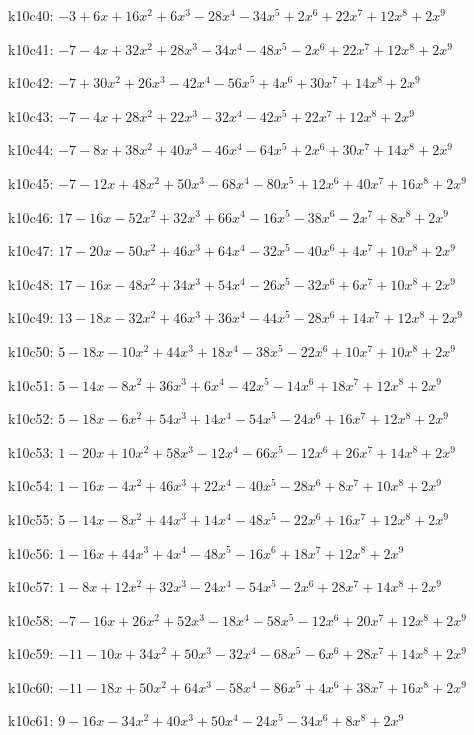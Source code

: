 k10c40: $ -3+6x+16x^{2}+6x^{3}-28x^{4}-34x^{5}+2x^{6}+22x^{7}+12x^{8}+2x^{9} $ 

k10c41: $ -7-4x+32x^{2}+28x^{3}-34x^{4}-48x^{5}-2x^{6}+22x^{7}+12x^{8}+2x^{9} $ 

k10c42: $ -7+30x^{2}+26x^{3}-42x^{4}-56x^{5}+4x^{6}+30x^{7}+14x^{8}+2x^{9} $ 

k10c43: $ -7-4x+28x^{2}+22x^{3}-32x^{4}-42x^{5}+22x^{7}+12x^{8}+2x^{9} $ 

k10c44: $ -7-8x+38x^{2}+40x^{3}-46x^{4}-64x^{5}+2x^{6}+30x^{7}+14x^{8}+2x^{9} $ 

k10c45: $ -7-12x+48x^{2}+50x^{3}-68x^{4}-80x^{5}+12x^{6}+40x^{7}+16x^{8}+2x^{9} $ 

k10c46: $ 17-16x-52x^{2}+32x^{3}+66x^{4}-16x^{5}-38x^{6}-2x^{7}+8x^{8}+2x^{9} $ 

k10c47: $ 17-20x-50x^{2}+46x^{3}+64x^{4}-32x^{5}-40x^{6}+4x^{7}+10x^{8}+2x^{9} $ 

k10c48: $ 17-16x-48x^{2}+34x^{3}+54x^{4}-26x^{5}-32x^{6}+6x^{7}+10x^{8}+2x^{9} $ 

k10c49: $ 13-18x-32x^{2}+46x^{3}+36x^{4}-44x^{5}-28x^{6}+14x^{7}+12x^{8}+2x^{9} $ 

k10c50: $ 5-18x-10x^{2}+44x^{3}+18x^{4}-38x^{5}-22x^{6}+10x^{7}+10x^{8}+2x^{9} $ 

k10c51: $ 5-14x-8x^{2}+36x^{3}+6x^{4}-42x^{5}-14x^{6}+18x^{7}+12x^{8}+2x^{9} $ 

k10c52: $ 5-18x-6x^{2}+54x^{3}+14x^{4}-54x^{5}-24x^{6}+16x^{7}+12x^{8}+2x^{9} $ 

k10c53: $ 1-20x+10x^{2}+58x^{3}-12x^{4}-66x^{5}-12x^{6}+26x^{7}+14x^{8}+2x^{9} $ 

k10c54: $ 1-16x-4x^{2}+46x^{3}+22x^{4}-40x^{5}-28x^{6}+8x^{7}+10x^{8}+2x^{9} $ 

k10c55: $ 5-14x-8x^{2}+44x^{3}+14x^{4}-48x^{5}-22x^{6}+16x^{7}+12x^{8}+2x^{9} $ 

k10c56: $ 1-16x+44x^{3}+4x^{4}-48x^{5}-16x^{6}+18x^{7}+12x^{8}+2x^{9} $ 

k10c57: $ 1-8x+12x^{2}+32x^{3}-24x^{4}-54x^{5}-2x^{6}+28x^{7}+14x^{8}+2x^{9} $ 

k10c58: $ -7-16x+26x^{2}+52x^{3}-18x^{4}-58x^{5}-12x^{6}+20x^{7}+12x^{8}+2x^{9} $ 

k10c59: $ -11-10x+34x^{2}+50x^{3}-32x^{4}-68x^{5}-6x^{6}+28x^{7}+14x^{8}+2x^{9} $ 

k10c60: $ -11-18x+50x^{2}+64x^{3}-58x^{4}-86x^{5}+4x^{6}+38x^{7}+16x^{8}+2x^{9} $ 

k10c61: $ 9-16x-34x^{2}+40x^{3}+50x^{4}-24x^{5}-34x^{6}+8x^{8}+2x^{9} $ 

